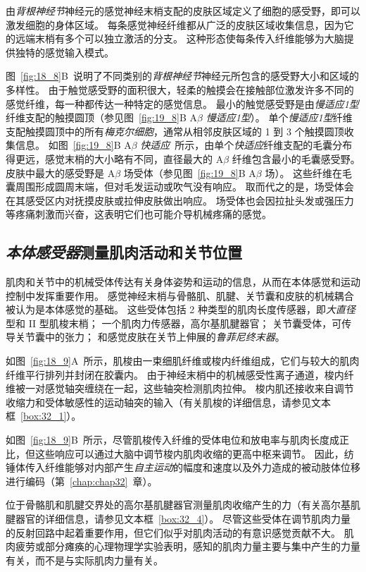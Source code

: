 由\textit{背根神经节}神经元的感觉神经末梢支配的皮肤区域定义了细胞的感受野，即可以激发细胞的身体区域。
每条感觉神经纤维都从广泛的皮肤区域收集信息，因为它的远端末梢有多个可以独立激活的分支。
这种形态使每条传入纤维能够为大脑提供独特的感觉输入模式。


图~\ref{fig:18_8}B~说明了不同类别的\textit{背根神经节}神经元所包含的感受野大小和区域的多样性。
由于触觉感受野的面积很大，轻柔的触摸会在接触部位激发许多不同的感觉纤维，每一种都传达一种特定的感觉信息。
最小的触觉感受野是由\textit{慢适应1型}纤维支配的触摸圆顶（参见图~\ref{fig:19_8}B A$\beta$ \textit{慢适应1型}）。
单个\textit{慢适应1型}纤维支配触摸圆顶中的所有\textit{梅克尔细胞}，通常从相邻皮肤区域的 1 到 3 个触摸圆顶收集信息。
如图~\ref{fig:19_8}B A$\beta$ \textit{快适应}~所示，由单个\textit{快适应}纤维支配的毛囊分布得更远，感觉末梢的大小略有不同，直径最大的 A$\beta$ 纤维包含最小的毛囊感受野。
皮肤中最大的感受野是 A$\beta$ 场受体（参见图~\ref{fig:19_8}B A$\beta$ 场）。
这些纤维在毛囊周围形成圆周末端，但对毛发运动或吹气没有响应。
取而代之的是，场受体会在其感受区内对抚摸皮肤或拉伸皮肤做出响应。
场受体也会因拉扯头发或强压力等疼痛刺激而兴奋，这表明它们也可能介导机械疼痛的感觉。



\subsection{\textit{本体感受器}测量肌肉活动和关节位置}

肌肉和关节中的机械受体传达有关身体姿势和运动的信息，从而在本体感觉和运动控制中发挥重要作用。
感觉神经末梢与骨骼肌、肌腱、关节囊和皮肤的机械耦合被认为是本体感觉的基础。
这些受体包括 2 种类型的肌肉长度传感器，即\textit{大直径}型和 II 型肌梭末梢；
一个肌肉力传感器，高尔基肌腱器官；
关节囊受体，可传导关节囊中的张力；
和感觉皮肤在关节上伸展的\textit{鲁菲尼终末器}。


如图~\ref{fig:18_9}A~所示，肌梭由一束细肌纤维或梭内纤维组成，它们与较大的肌肉纤维平行排列并封闭在胶囊内。
由于神经末梢中的机械感受性离子通道，梭内纤维被一对感觉轴突缠绕在一起，这些轴突检测肌肉拉伸。
梭内肌还接收来自调节收缩力和受体敏感性的运动轴突的输入（有关肌梭的详细信息，请参见文本框~\ref{box:32_1}）。


如图~\ref{fig:18_9}B~所示，尽管肌梭传入纤维的受体电位和放电率与肌肉长度成正比，但这些响应可以通过大脑中调节梭内肌肉收缩的更高中枢来调节。
因此，纺锤体传入纤维能够对内部产生\textit{自主运动}的幅度和速度以及外力造成的被动肢体位移进行编码（第~\ref{chap:chap32}~章）。


位于骨骼肌和肌腱交界处的高尔基肌腱器官测量肌肉收缩产生的力（有关高尔基肌腱器官的详细信息，请参见文本框~\ref{box:32_4}）。
尽管这些受体在调节肌肉力量的反射回路中起着重要作用，但它们似乎对肌肉活动的有意识感觉贡献不大。
肌肉疲劳或部分瘫痪的心理物理学实验表明，感知的肌肉力量主要与集中产生的力量有关，而不是与实际肌肉力量有关。


